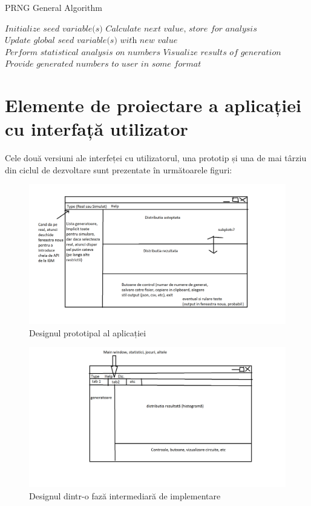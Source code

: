 \begin{algorithm}[H]
    \caption{PRNG General Algorithm}\label{alg:PRNG}
    \begin{algorithmic}[1]
        \State $\textit{Initialize seed variable(s)}$
        \State $\textit{Calculate next value, store for analysis}$
        \State $\textit{Update global seed variable(s) with new value}$
        \EndFor
        \State $\textit{Perform statistical analysis on numbers}$
        \State $\textit{Visualize results of generation}$
        \State $\textit{Provide generated numbers to user in some format}$
        \EndFor
        \EndProcedure
    \end{algorithmic}
\end{algorithm}

\section{Elemente de proiectare a aplicației cu interfață utilizator}

Cele două versiuni ale interfeței cu utilizatorul, una prototip și una de mai târziu din ciclul de dezvoltare sunt prezentate în următoarele figuri:

\begin{figure}[H]
    \centering
    \includegraphics[width=1.0\textwidth]{continut/capitol2/figuri/Design.png}
    \caption{Designul prototipal al aplicației}
    \label{fig:GUIPrototype}
\end{figure}

\begin{figure}[H]
    \centering
    \includegraphics[width=1.0\textwidth]{continut/capitol2/figuri/Design2.png}
    \caption{Designul dintr-o fază intermediară de implementare}
    \label{fig:GUIIntermediate}
\end{figure}